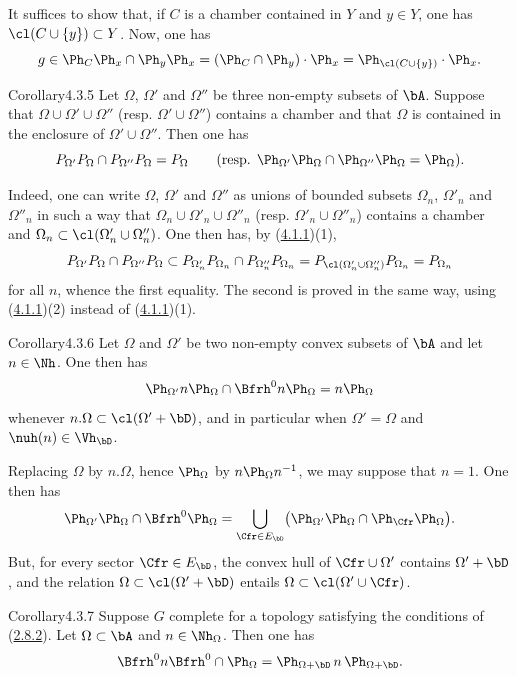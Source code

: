 \documentclass[12pt,a4paper,oneside,english]{smfart}
\makeatletter
\newcommand{\btanchor}[1]{\leavevmode\Hy@raisedlink{\hypertarget{bt:#1}{}}}
\newcommand{\btref}[1]{\hyperlink{bt:#1}{#1}}
\theoremstyle{definition}
\theoremstyle{bt}
\makeatother
\begin{document}
It suffices to show that, if $C$ is a chamber contained in $Y$ and $y\in Y$,
one has $\cl(C\cup\{y\}) \subset Y$. Now, one has
\[
g \in \Ph_{C}\Ph_{x}\cap\Ph_{y}\Ph_{x}     = (\Ph_{C}\cap\Ph_{y})\cdot\Ph_{x}     = \Ph_{\cl(C\cup\{y\})}\cdot\Ph_{x}.
\]

\begin{state}{Corollary}{4.3.5}\btanchor{4.3.5}
Let $\Omega$, $\Omega'$ and $\Omega''$ be three non-empty subsets of $\bA$.
Suppose that $\Omega\cup\Omega'\cup\Omega''$ (resp.
$\Omega'\cup\Omega''$) contains a chamber and that $\Omega$ is contained in
the enclosure of $\Omega'\cup\Omega''$. Then one has
\[
P_{\Omega'}P_{\Omega}\cap P_{\Omega''}P_{\Omega} = P_{\Omega}
\qquad(\text{resp. }
\Ph_{\Omega'}\Ph_{\Omega}\cap\Ph_{\Omega''}\Ph_{\Omega} = \Ph_{\Omega}).
\]
\end{state}

Indeed, one can write $\Omega$, $\Omega'$ and $\Omega''$ as unions of bounded
subsets $\Omega_n$, $\Omega'_n$ and $\Omega''_n$ in such a way that
$\Omega_n\cup\Omega'_n\cup\Omega''_n$ (resp. $\Omega'_n\cup\Omega''_n$)
contains a chamber and $\Omega_n \subset \cl(\Omega'_n\cup\Omega''_n)$. One
then has, by (\btref{4.1.1})(1),
\[
P_{\Omega'}P_{\Omega}\cap P_{\Omega''}P_{\Omega}
\subset P_{\Omega'_n}P_{\Omega_n}\cap P_{\Omega''_n}P_{\Omega_n}
= P_{\cl(\Omega'_n\cup\Omega''_n)}P_{\Omega_n} = P_{\Omega_n}
\]
for all $n$, whence the first equality. The second is proved in the same way,
using (\btref{4.1.1})(2) instead of (\btref{4.1.1})(1).

\begin{state}{Corollary}{4.3.6}\btanchor{4.3.6}
Let $\Omega$ and $\Omega'$ be two non-empty convex subsets of $\bA$ and let
$n\in\Nh$. One then has
\[
\Ph_{\Omega'}n\Ph_{\Omega}\cap\Bfrh^{0}n\Ph_{\Omega} = n\Ph_{\Omega}
\]
whenever $n.\Omega\subset\cl(\Omega'+\bD)$, and in particular when
$\Omega' = \Omega$ and $\nuh(n)\in\Vh_{\bD}$.
\end{state}

Replacing $\Omega$ by $n.\Omega$, hence $\Ph_{\Omega}$ by
$n\Ph_{\Omega}n^{-1}$, we may suppose that $n = 1$. One then has
\[
\Ph_{\Omega'}\Ph_{\Omega}\cap\Bfrh^{0}\Ph_{\Omega}
= \bigcup_{\Cfr\in E_{\bD}}
  \bigl(\Ph_{\Omega'}\Ph_{\Omega}\cap\Ph_{\Cfr}\Ph_{\Omega}\bigr).
\]
But, for every sector $\Cfr\in E_{\bD}$, the convex hull of
$\Cfr\cup\Omega'$ contains $\Omega'+\bD$, and the relation
$\Omega\subset\cl(\Omega'+\bD)$ entails $\Omega\subset\cl(\Omega'\cup\Cfr)$.

\begin{state}{Corollary}{4.3.7}\btanchor{4.3.7}
Suppose $G$ complete for a topology satisfying the conditions of (\btref{2.8.2}). Let
$\Omega\subset\bA$ and $n\in\Nh_{\Omega}$. Then one has
\[
\Bfrh^{0}n\Bfrh^{0}\cap\Ph_{\Omega}
= \Ph_{\Omega+\bD}\,n\,\Ph_{\Omega+\bD}.
\]
\end{state}
\end{document}
